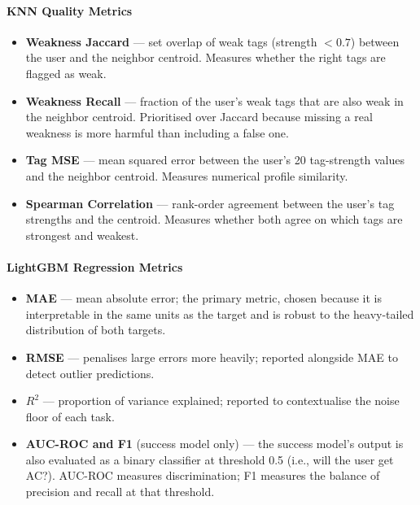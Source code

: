 \documentclass[12pt,a4paper]{article}
\begin{document}
\paragraph{KNN Quality Metrics}
\begin{itemize}
    \item \textbf{Weakness Jaccard} --- set overlap of weak tags (strength $< 0.7$)
          between the user and the neighbor centroid. Measures whether the
          right tags are flagged as weak.
    \item \textbf{Weakness Recall} --- fraction of the user's weak tags that are
          also weak in the neighbor centroid. Prioritised over Jaccard because
          missing a real weakness is more harmful than including a false one.
    \item \textbf{Tag MSE} --- mean squared error between the user's 20
          tag-strength values and the neighbor centroid. Measures numerical
          profile similarity.
    \item \textbf{Spearman Correlation} --- rank-order agreement between the
          user's tag strengths and the centroid. Measures whether both agree
          on which tags are strongest and weakest.
\end{itemize}

\paragraph{LightGBM Regression Metrics}
\begin{itemize}
    \item \textbf{MAE} --- mean absolute error; the primary metric, chosen
          because it is interpretable in the same units as the target and is
          robust to the heavy-tailed distribution of both targets.
    \item \textbf{RMSE} --- penalises large errors more heavily; reported
          alongside MAE to detect outlier predictions.
    \item \textbf{$R^2$} --- proportion of variance explained; reported to
          contextualise the noise floor of each task.
    \item \textbf{AUC-ROC and F1} (success model only) --- the success model's
          output is also evaluated as a binary classifier at threshold 0.5
          (i.e., will the user get AC?). AUC-ROC measures discrimination;
          F1 measures the balance of precision and recall at that threshold.
\end{itemize}
\end{document}
